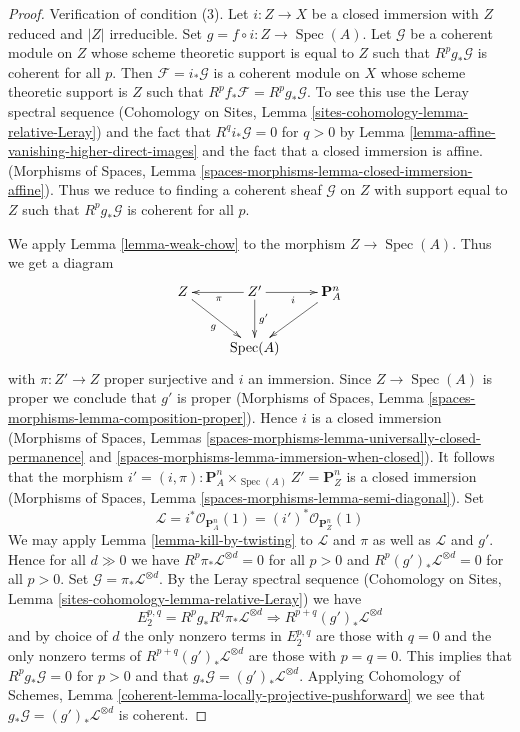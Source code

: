 \documentclass{stacks-project}
\theoremstyle{plain}
\theoremstyle{definition}
\theoremstyle{remark}
\numberwithin{equation}{subsection}
\def\Spec{\mathop{\mathrm{Spec}}}
\begin{document}
\begin{proof}
\medskip\noindent
Verification of condition (3). Let $i : Z \to X$ be a closed immersion
with $Z$ reduced and $|Z|$ irreducible. Set $g = f \circ i : Z \to \Spec(A)$.
Let $\mathcal{G}$ be a coherent module on $Z$ whose scheme theoretic support
is equal to $Z$ such that $R^pg_*\mathcal{G}$ is coherent for all $p$.
Then $\mathcal{F} = i_*\mathcal{G}$ is a coherent module on
$X$ whose scheme theoretic support is $Z$ such that
$R^pf_*\mathcal{F} = R^pg_*\mathcal{G}$. To see this use
the Leray spectral sequence
(Cohomology on Sites, Lemma \ref{sites-cohomology-lemma-relative-Leray})
and the fact that $R^qi_*\mathcal{G} = 0$ for $q > 0$ by
Lemma \ref{lemma-affine-vanishing-higher-direct-images}
and the fact that a closed immersion is affine.
(Morphisms of Spaces, Lemma
\ref{spaces-morphisms-lemma-closed-immersion-affine}).
Thus we reduce to finding a coherent sheaf $\mathcal{G}$ on $Z$
with support equal to $Z$ such that $R^pg_*\mathcal{G}$ is coherent
for all $p$.

\medskip\noindent
We apply Lemma \ref{lemma-weak-chow} to the morphism $Z \to \Spec(A)$.
Thus we get a diagram
$$
\xymatrix{
Z \ar[rd]_g & Z' \ar[d]^-{g'} \ar[l]^\pi \ar[r]_i & \mathbf{P}^n_A \ar[dl] \\
& \Spec(A) &
}
$$
with $\pi : Z' \to Z$ proper surjective and $i$ an immersion.
Since $Z \to \Spec(A)$ is proper we conclude that $g'$ is proper
(Morphisms of Spaces, Lemma \ref{spaces-morphisms-lemma-composition-proper}).
Hence $i$ is a closed immersion
(Morphisms of Spaces, Lemmas
\ref{spaces-morphisms-lemma-universally-closed-permanence} and
\ref{spaces-morphisms-lemma-immersion-when-closed}).
It follows that the morphism
$i' = (i, \pi) : \mathbf{P}^n_A \times_{\Spec(A)} Z' = \mathbf{P}^n_Z$ is
a closed immersion
(Morphisms of Spaces, Lemma \ref{spaces-morphisms-lemma-semi-diagonal}).
Set
$$
\mathcal{L} =
i^*\mathcal{O}_{\mathbf{P}^n_A}(1) =
(i')^*\mathcal{O}_{\mathbf{P}^n_Z}(1)
$$
We may apply Lemma \ref{lemma-kill-by-twisting}
to $\mathcal{L}$ and $\pi$ as well as $\mathcal{L}$ and $g'$.
Hence for all $d \gg 0$ we have
$R^p\pi_*\mathcal{L}^{\otimes d} = 0$ for all $p > 0$ and
$R^p(g')_*\mathcal{L}^{\otimes d} = 0$ for all $p > 0$.
Set $\mathcal{G} = \pi_*\mathcal{L}^{\otimes d}$.
By the Leray spectral sequence
(Cohomology on Sites, Lemma \ref{sites-cohomology-lemma-relative-Leray})
we have
$$
E_2^{p, q} = R^pg_* R^q\pi_*\mathcal{L}^{\otimes d}
\Rightarrow
R^{p + q}(g')_*\mathcal{L}^{\otimes d}
$$
and by choice of $d$ the only nonzero terms in $E_2^{p, q}$ are
those with $q = 0$ and the only nonzero terms of
$R^{p + q}(g')_*\mathcal{L}^{\otimes d}$ are those with $p = q = 0$.
This implies that $R^pg_*\mathcal{G} = 0$ for $p > 0$ and
that $g_*\mathcal{G} = (g')_*\mathcal{L}^{\otimes d}$.
Applying
Cohomology of Schemes, Lemma
\ref{coherent-lemma-locally-projective-pushforward}
we see that $g_*\mathcal{G} = (g')_*\mathcal{L}^{\otimes d}$ is
coherent.


\end{proof}
\end{document}
